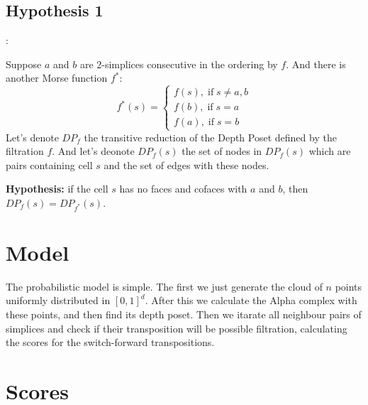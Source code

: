 \documentclass{article}
\begin{document}
\subsection{Hypothesis 1}: 
\par Suppose $a$ and $b$ are 2-simplices consecutive in the ordering by $f$. And there is another Morse function $f^*$: 
$$
f^*(s) = 
\begin{cases}
f(s), \; \text{if} \; s\ne a, b \\
f(b), \; \text{if} \; s = a \\
f(a), \; \text{if} \; s = b
\end{cases}
$$
Let's denote $DP_{f}$ the transitive reduction of the Depth Poset defined by the filtration $f$. And let's deonote $DP_{f}(s)$ the set of nodes in $DP_f(s)$ which are pairs containing cell $s$ and the set of edges with these nodes.

\par \textbf{Hypothesis:} if the cell $s$ has no faces and cofaces with $a$ and $b$, then $DP_f(s) = DP_{f^*}(s)$.


\section{Model}
\par The probabilistic model is simple. The first we just generate the cloud of $n$ points uniformly distributed in $[0, 1]^d$. After this we calculate the Alpha complex with these points, and then find its depth poset. Then we itarate all neighbour pairs of simplices and check if their transposition will be possible filtration, calculating the scores for the switch-forward transpositions.


\section{Scores}
\end{document}
